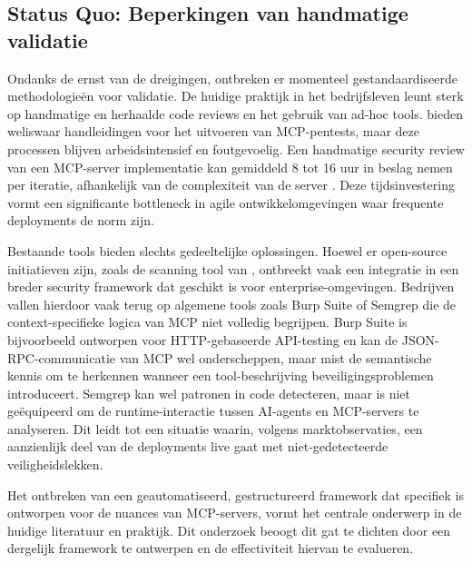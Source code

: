\subsection{Status Quo: Beperkingen van handmatige validatie}

Ondanks de ernst van de dreigingen, ontbreken er momenteel gestandaardiseerde methodologieën voor validatie. De huidige praktijk in het bedrijfsleven leunt sterk op handmatige en herhaalde code reviews en het gebruik van ad-hoc tools. \textcite{Uproot2025} bieden weliswaar handleidingen voor het uitvoeren van MCP-pentests, maar deze processen blijven arbeidsintensief en foutgevoelig. Een handmatige security review van een MCP-server implementatie kan gemiddeld 8 tot 16 uur in beslag nemen per iteratie, afhankelijk van de complexiteit van de server \autocite{Uproot2025}. Deze tijdsinvestering vormt een significante bottleneck in agile ontwikkelomgevingen waar frequente deployments de norm zijn.

Bestaande tools bieden slechts gedeeltelijke oplossingen. Hoewel er open-source initiatieven zijn, zoals de scanning tool van \textcite{Invariant2025}, ontbreekt vaak een integratie in een breder security framework dat geschikt is voor enterprise-omgevingen. Bedrijven vallen hierdoor vaak terug op algemene tools zoals Burp Suite of Semgrep die de context-specifieke logica van MCP niet volledig begrijpen. Burp Suite is bijvoorbeeld ontworpen voor HTTP-gebaseerde API-testing en kan de JSON-RPC-communicatie van MCP wel onderscheppen, maar mist de semantische kennis om te herkennen wanneer een tool-beschrijving beveiligingsproblemen introduceert. Semgrep kan wel patronen in code detecteren, maar is niet geëquipeerd om de runtime-interactie tussen AI-agents en MCP-servers te analyseren. Dit leidt tot een situatie waarin, volgens marktobservaties, een aanzienlijk deel van de deployments live gaat met niet-gedetecteerde veiligheidslekken.

Het ontbreken van een geautomatiseerd, gestructureerd framework dat specifiek is ontworpen voor de nuances van MCP-servers, vormt het centrale onderwerp in de huidige literatuur en praktijk. Dit onderzoek beoogt dit gat te dichten door een dergelijk framework te ontwerpen en de effectiviteit hiervan te evalueren.


